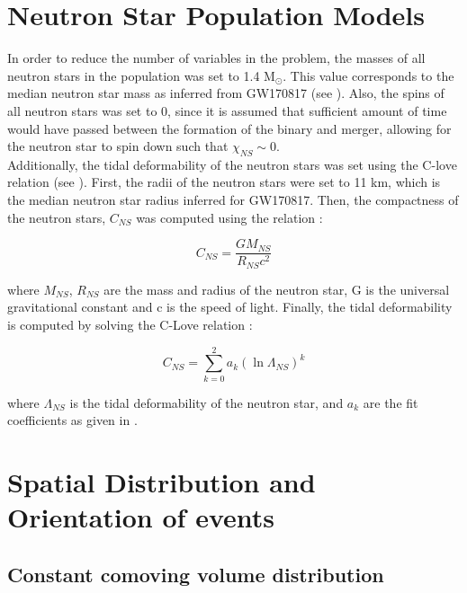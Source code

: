 
\section{Neutron Star Population Models}\label{sec:ns_pop}

    In order to reduce the number of variables in the problem, the masses of all neutron
    stars in the population was set to 1.4 M$_\odot$. This value corresponds to the
    median neutron star mass as inferred from GW170817 (see \cite{abbott_2018}). Also,
    the spins of all neutron stars was set to 0, since it is assumed that sufficient
    amount of time would have passed between the formation of the binary and merger,
    allowing for the neutron star to spin down such that $\chi_{NS} \sim 0$.\\
    Additionally, the tidal deformability of the neutron stars was set using the C-love
    relation (see \cite{yagi_2017}). First, the radii of the neutron stars were set to
    11 km, which is the median neutron star radius inferred for GW170817. Then, the
    compactness of the neutron stars, $C_{NS}$ was computed using the relation :

    \begin{equation}
        C_{NS} = \dfrac{G M_{NS}}{R_{NS} c^2}
    \end{equation}

    where $M_{NS}$, $R_{NS}$ are the mass and radius of the neutron star, G is the
    universal gravitational constant and c is the speed of light.  Finally, the tidal
    deformability is computed by solving the C-Love relation :

    \begin{equation}
        C_{NS} = \sum_{k=0}^{2} a_k (\ln \Lambda_{NS})^k
    \end{equation}

    where $\Lambda_{NS}$ is the tidal deformability of the neutron star, and $a_k$ are
    the fit coefficients as given in \cite{yagi_2017}.

\section{Spatial Distribution and Orientation of events}\label{sec:space_dist}

    \subsection{Constant comoving volume distribution}

